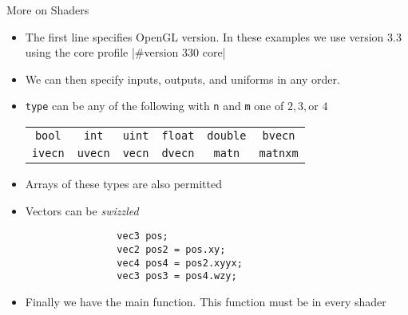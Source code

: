 \documentclass{beamer}
\begin{document}
\begin{frame}[fragile]{More on Shaders}
    \begin{itemize}
        \item The first line specifies OpenGL version. In these examples we use version 3.3 using the core profile
              |#version 330 core|
        \item We can then specify inputs, outputs, and uniforms in any order.
        \item {\color{blue}\verb"type"} can be any of the following with {\color{red}\verb"n"} and
                  {\color{red}\verb"m"} one of $2, 3, \textrm{or }4$
              \begin{tabular}{c c c c c c}
                  {\color{blue}\verb"bool"}                                      & {\color{blue}\verb"int"}                                      & {\color{blue}\verb"uint"}                                      & {\color{blue}\verb"float"} & {\color{blue}\verb"double"} & {\color{blue}\verb"bvec"}{\color{red}\verb"n"} \\
                  {\color{blue}\verb"ivec"}{\color{red}\verb"n"} & {\color{blue}\verb"uvec"}{\color{red}\verb"n"} & {\color{blue}\verb"vec"}{\color{red}\verb"n"} &
                  {\color{blue}\verb"dvec"}{\color{red}\verb"n"} & {\color{blue}\verb"mat"}{\color{red}\verb"n"} &
                  {\color{blue}\verb"mat"}{\color{red}\verb"n"}{\color{blue}\verb"x"}{\color{red}\verb"m"}                                                                                                                                                                                                                                         \\
              \end{tabular}
        \item Arrays of these types are also permitted
        \item Vectors can be \emph{swizzled}
              \begin{verbatim}
                vec3 pos;
                vec2 pos2 = pos.xy;
                vec4 pos4 = pos2.xyyx;
                vec3 pos3 = pos4.wzy;
            \end{verbatim}
        \item Finally we have the main function. This function must be in every shader
    \end{itemize}
\end{frame}
\end{document}
